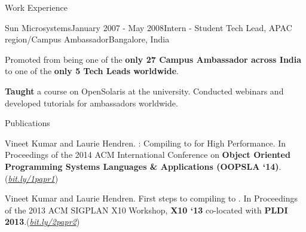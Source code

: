 \documentclass{resume} %
\begin{document}
\begin{rSection}{Work Experience}
\begin{rSubsection}{Sun Microsystems}{January 2007 - May 2008}{Intern - Student
        Tech Lead, APAC region/Campus Ambassador}{Bangalore, India}
\item Promoted from being one of the \textbf{only 27 Campus Ambassador across
	India} to one of the \textbf{only 5 Tech Leads worldwide}.  
\begin{lsubSubsection}
\item \textbf{Taught} a course on OpenSolaris at the university. Conducted
	webinars and developed tutorials for ambassadors worldwide.
\end{lsubSubsection}
\end{rSubsection}
\end{rSection}


\begin{rSection}{Publications}
\smallskip
\begin{lSubsection}


\item Vineet Kumar and Laurie Hendren. \mixten: Compiling \matlab to \xten for
	High Performance. In Proceedings of the 2014 ACM International
	Conference on \textbf{Object Oriented Programming Systems Languages \&
	Applications (OOPSLA
	`14)}.(\href{http://bit.ly/1papr1}{\em{bit.ly/1papr1}})

%
\item Vineet Kumar and Laurie Hendren. First steps to compiling \matlab to
	\xten. In Proceedings of the 2013 ACM SIGPLAN X10 Workshop, \textbf{X10
	`13} co-located with \textbf{PLDI
	2013}.(\href{http://bit.ly/2papr2}{\em{bit.ly/2papr2}})
\end{lSubsection}
\end{rSection}

 
\end{document}
